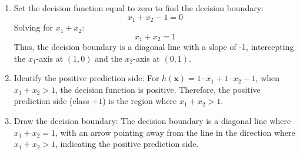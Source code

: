 \begin{example}
\begin{enumerate}
\begin{enumerate}
                \item Set the decision function equal to zero to find the decision boundary:
                \[
                x_1 + x_2 - 1 = 0
                \]
                Solving for \( x_1 + x_2 \):
                \[
                x_1 + x_2 = 1
                \]
                Thus, the decision boundary is a diagonal line with a slope of -1, intercepting the \( x_1 \)-axis at \( (1, 0) \) and the \( x_2 \)-axis at \( (0, 1) \).
        
                \item Identify the positive prediction side:
                For \(h(\mathbf{x}) = 1 \cdot x_1 + 1 \cdot x_2 - 1 \), when \( x_1 + x_2 > 1 \), the decision function is positive. Therefore, the positive prediction side (class \( +1 \)) is the region where \( x_1 + x_2 > 1 \).
        
                \item Draw the decision boundary:
                The decision boundary is a diagonal line where \( x_1 + x_2 = 1 \), with an arrow pointing away from the line in the direction where \( x_1 + x_2 > 1 \), indicating the positive prediction side.
            
            \end{enumerate}
        \end{enumerate}

    \end{example}
    


